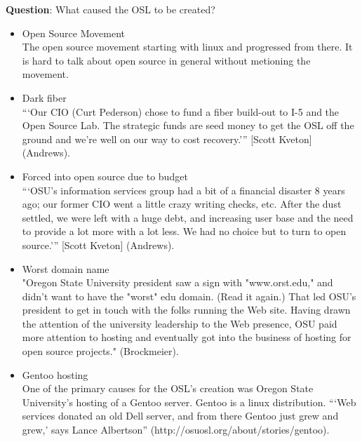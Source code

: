 \noindent\textbf{Question}: What caused the OSL to be created?
\begin{itemize}
    \item Open Source Movement \\
        The open source movement starting with linux and progressed from there.
        It is hard to talk about open source in general without metioning the
        movement.

    \item Dark fiber \\
        ```Our CIO (Curt Pederson) chose to fund a fiber build-out to I-5 and the Open
        Source Lab. The strategic funds are seed money to get the OSL off the ground
        and we're well on our way to cost recovery.''' [Scott Kveton] (Andrews).

    \item Forced into open source due to budget \\
        ```OSU's information services group had a bit of a financial disaster 8 years
        ago; our former CIO went a little crazy writing checks, etc. After the dust
        settled, we were left with a huge debt, and increasing user base and the need
        to provide a lot more with a lot less. We had no choice but to turn to open
        source.''' [Scott Kveton] (Andrews).

    \item Worst domain name \\
        "Oregon State University president saw a sign with "www.orst.edu," and didn't
        want to have the "worst" edu domain. (Read it again.) That led OSU's president
        to get in touch with the folks running the Web site. Having drawn the attention
        of the university leadership to the Web presence, OSU paid more attention to
        hosting and eventually got into the business of hosting for open source
        projects." (Brockmeier).

    \item Gentoo hosting \\
        \tab One of the primary causes for the OSL's creation was Oregon State University's
        hosting of a Gentoo server. Gentoo is a linux distribution. ```Web services
        donated an old Dell server, and from there Gentoo just grew and grew,' says
        Lance Albertson'' (http://osuosl.org/about/stories/gentoo).
\end{itemize}
